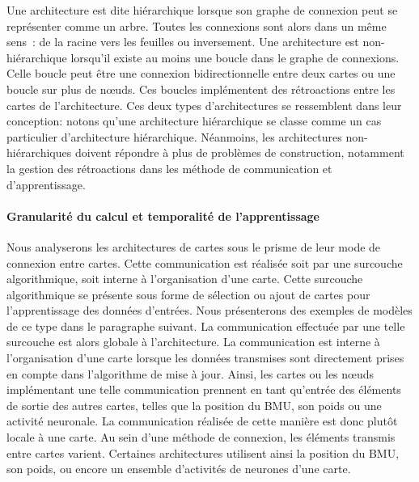 \documentclass[../main]{subfiles}
\begin{document}
Une architecture est dite hiérarchique lorsque son graphe de connexion peut se représenter comme un arbre. Toutes les connexions sont alors dans un même sens~: de la racine vers les feuilles ou inversement.
Une architecture est non-hiérarchique lorsqu'il existe au moins une boucle dans le graphe de connexions. Celle boucle peut être une connexion bidirectionnelle entre deux cartes ou une boucle sur plus de n\oe{}uds. Ces boucles implémentent des rétroactions entre les cartes de l'architecture.
Ces deux types d'architectures se ressemblent dans leur conception: notons qu'une architecture hiérarchique se classe comme un cas particulier d'architecture hiérarchique. Néanmoins, les architectures non-hiérarchiques doivent répondre à plus de problèmes de construction, notamment la gestion des rétroactions dans les méthode de communication et d'apprentissage.

\paragraph{Granularité du calcul et temporalité de l'apprentissage}

Nous analyserons les architectures de cartes sous le prisme de leur mode de connexion entre cartes. Cette communication est réalisée soit par une surcouche algorithmique, soit interne à l'organisation d'une carte.
Cette surcouche algorithmique se présente sous forme de sélection ou ajout de cartes pour l'apprentissage des données d'entrées. Nous présenterons des exemples de modèles de ce type dans le paragraphe suivant. La communication effectuée par une telle surcouche est alors globale à l'architecture.
La communication est interne à l'organisation d'une carte lorsque les données transmises sont directement prises en compte dans l'algorithme de mise à jour. Ainsi, les cartes ou les n\oe{}uds implémentant une telle communication prennent en tant qu'entrée des éléments de sortie des autres cartes, telles que la position du BMU, son poids ou une activité neuronale. La communication réalisée de cette manière est donc plutôt locale à une carte.
Au sein d'une méthode de connexion, les éléments transmis entre cartes varient. Certaines architectures utilisent ainsi la position du BMU, son poids, ou encore un ensemble d'activités de neurones d'une carte.
\end{document}
